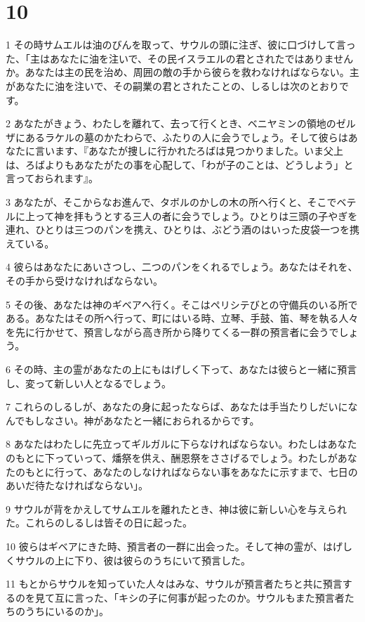\chapter{10}

\par 1 その時サムエルは油のびんを取って、サウルの頭に注ぎ、彼に口づけして言った、「主はあなたに油を注いで、その民イスラエルの君とされたではありませんか。あなたは主の民を治め、周囲の敵の手から彼らを救わなければならない。主があなたに油を注いで、その嗣業の君とされたことの、しるしは次のとおりです。
\par 2 あなたがきょう、わたしを離れて、去って行くとき、ベニヤミンの領地のゼルザにあるラケルの墓のかたわらで、ふたりの人に会うでしょう。そして彼らはあなたに言います、『あなたが捜しに行かれたろばは見つかりました。いま父上は、ろばよりもあなたがたの事を心配して、「わが子のことは、どうしよう」と言っておられます』。
\par 3 あなたが、そこからなお進んで、タボルのかしの木の所へ行くと、そこでベテルに上って神を拝もうとする三人の者に会うでしょう。ひとりは三頭の子やぎを連れ、ひとりは三つのパンを携え、ひとりは、ぶどう酒のはいった皮袋一つを携えている。
\par 4 彼らはあなたにあいさつし、二つのパンをくれるでしょう。あなたはそれを、その手から受けなければならない。
\par 5 その後、あなたは神のギベアへ行く。そこはペリシテびとの守備兵のいる所である。あなたはその所へ行って、町にはいる時、立琴、手鼓、笛、琴を執る人々を先に行かせて、預言しながら高き所から降りてくる一群の預言者に会うでしょう。
\par 6 その時、主の霊があなたの上にもはげしく下って、あなたは彼らと一緒に預言し、変って新しい人となるでしょう。
\par 7 これらのしるしが、あなたの身に起ったならば、あなたは手当たりしだいになんでもしなさい。神があなたと一緒におられるからです。
\par 8 あなたはわたしに先立ってギルガルに下らなければならない。わたしはあなたのもとに下っていって、燔祭を供え、酬恩祭をささげるでしょう。わたしがあなたのもとに行って、あなたのしなければならない事をあなたに示すまで、七日のあいだ待たなければならない」。
\par 9 サウルが背をかえしてサムエルを離れたとき、神は彼に新しい心を与えられた。これらのしるしは皆その日に起った。
\par 10 彼らはギベアにきた時、預言者の一群に出会った。そして神の霊が、はげしくサウルの上に下り、彼は彼らのうちにいて預言した。
\par 11 もとからサウルを知っていた人々はみな、サウルが預言者たちと共に預言するのを見て互に言った、「キシの子に何事が起ったのか。サウルもまた預言者たちのうちにいるのか」。
